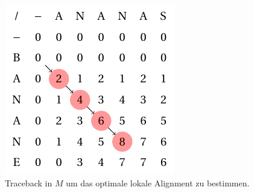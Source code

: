 \begin{figure}[!b]
  \centering
  \includegraphics[width=.48\linewidth]{./img/sw_matrix/matrix_03.pdf}%
  \caption{Traceback in $M$ um das optimale lokale Alignment zu bestimmen.}
  \label{fig:matrix:trace}%
\end{figure}
